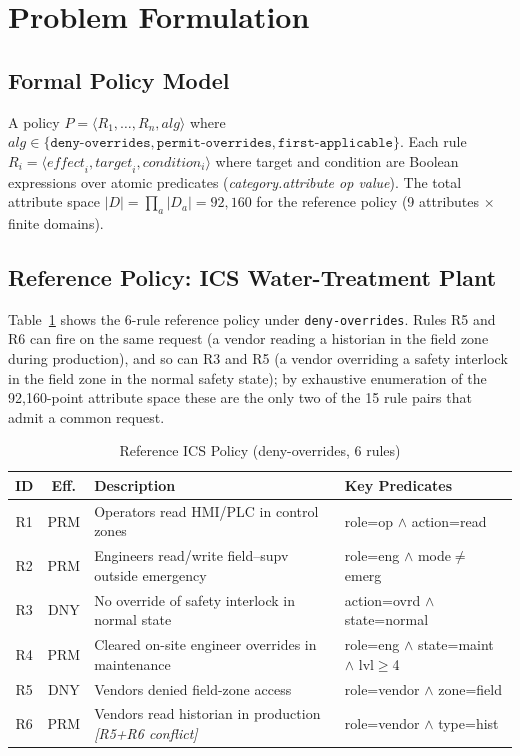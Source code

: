 \documentclass[conference]{IEEEtran}
\begin{document}
\section{Problem Formulation}

\subsection{Formal Policy Model}

A policy $P = \langle R_1, \ldots, R_n, \mathit{alg} \rangle$ where
$\mathit{alg} \in \{\texttt{deny-overrides}, \texttt{permit-overrides},
\texttt{first-applicable}\}$. Each rule $R_i = \langle \mathit{effect}_i,
\mathit{target}_i, \mathit{condition}_i \rangle$ where target and condition are
Boolean expressions over atomic predicates (\textit{category.attribute op
value}). The total attribute space $|D| = \prod_a |D_a| = 92{,}160$ for the
reference policy (9 attributes $\times$ finite domains).

\subsection{Reference Policy: ICS Water-Treatment Plant}

Table~\ref{tab:policy} shows the 6-rule reference policy under
\texttt{deny-overrides}. Rules R5 and R6 can fire on the same request (a vendor reading a historian
in the field zone during production), and so can R3 and R5 (a vendor
overriding a safety interlock in the field zone in the normal safety state);
by exhaustive enumeration of the 92{,}160-point attribute space these are the
only two of the 15 rule pairs that admit a common request.

\begin{table}[htbp]
\caption{Reference ICS Policy (deny-overrides, 6 rules)}
\label{tab:policy}
\begin{center}
\begin{tabular}{|c|c|p{2.2cm}|p{2.2cm}|}
\hline
\textbf{ID} & \textbf{Eff.} & \textbf{Description} & \textbf{Key Predicates} \\
\hline
R1 & PRM & Operators read HMI/PLC in control zones
   & role=op $\wedge$ action=read \\
\hline
R2 & PRM & Engineers read/write field--supv outside emergency
   & role=eng $\wedge$ mode$\neq$emerg \\
\hline
R3 & DNY & No override of safety interlock in normal state
   & action=ovrd $\wedge$ state=normal \\
\hline
R4 & PRM & Cleared on-site engineer overrides in maintenance
   & role=eng $\wedge$ state=maint $\wedge$ lvl$\geq$4 \\
\hline
R5 & DNY & Vendors denied field-zone access
   & role=vendor $\wedge$ zone=field \\
\hline
R6 & PRM & Vendors read historian in production \textit{[R5+R6 conflict]}
   & role=vendor $\wedge$ type=hist \\
\hline
\end{tabular}
\end{center}
\end{table}
\end{document}
